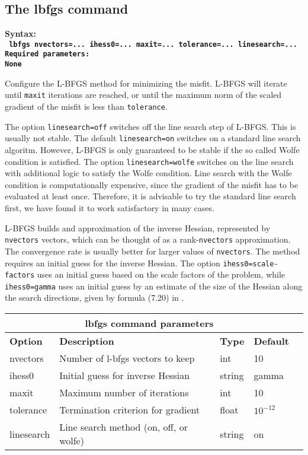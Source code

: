 \documentclass[12pt]{report}
\begin{document}
\subsection{The lbfgs command}\label{sec:lbfgs}
\begin{flushleft}\bf
Syntax:\\
\tt
lbfgs nvectors=... ihess0=... maxit=... tolerance=... linesearch=...
\\
\bf Required parameters:\\
\rm
None
\end{flushleft}
Configure the L-BFGS method for minimizing the misfit. L-BFGS will iterate until \verb+maxit+ iterations
are reached, or until the maximum norm of the scaled gradient of the misfit is less than \verb+tolerance+. 
\par
The option {\tt linesearch=off} switches off the line search step of L-BFGS. This is usually not stable.
The default {\tt linesearch=on} switches on a standard line search algoritm. However, L-BFGS is only guaranteed to
be stable if the so called Wolfe condition is satisfied. The option {\tt linesearch=wolfe} switches on
the line search with additional logic to satisfy the Wolfe condition. Line search with the Wolfe condition 
is computationally expensive, since the gradient of the misfit has to be evaluated at least once. Therefore,
it is advisable to try the standard line search first, we have found it to work satisfactory in many cases.
\par
L-BFGS builds and approximation of the inverse Hessian, represented by \verb+nvectors+ vectors, which can
be thought of as a rank-\verb+nvectors+ approximation. The convergence rate is usually better for larger 
values of \verb+nvectors+. The method requires an initial guess for the inverse Hessian. The option
{\tt ihess0=scale-factors} uses an initial guess based on the scale factors of the problem, while
{\tt ihess0=gamma} uses an initial guess by an estimate of the size of the Hessian along the search 
directions, given by formula (7.20) in \cite{Nocedal-Wright}.

\begin{center}
\begin{tabular}{|l|p{7cm}|l|l|l|} \hline
\multicolumn{4}{|c|}{\bf lbfgs command parameters}\\ \hline
{\bf Option} & {\bf Description}          & {\bf Type} & {\bf Default} \\ \hline 
\hline
nvectors   & Number of l-bfgs vectors to keep & int   & 10 \\ \hline
ihess0     & Initial guess for inverse Hessian & string & gamma \\ \hline
maxit      & Maximum number of iterations  & int & 10 \\ \hline
tolerance  & Termination criterion for gradient  & float & $10^{-12}$ \\ \hline
linesearch  & Line search method (on, off, or wolfe)  & string & on \\ \hline
\end{tabular}
\end{center}
\end{document}
